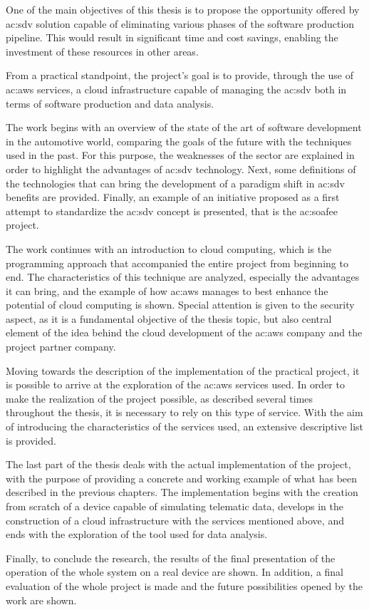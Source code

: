 One of the main objectives of this thesis is to propose the opportunity offered by \gls{ac:sdv} solution capable of eliminating various phases of the software production pipeline. This would result in significant time and cost savings, enabling the investment of these resources in other areas.

From a practical standpoint, the project's goal is to provide, through the use of \gls{ac:aws} services, a cloud infrastructure capable of managing the \gls{ac:sdv} both in terms of software production and data analysis.

The work begins with an overview of the state of the art of software development in the automotive world, comparing the goals of the future with the techniques used in the past. For this purpose, the weaknesses of the sector are explained in order to highlight the advantages of \gls{ac:sdv} technology. Next, some definitions of the technologies that can bring the development of a paradigm shift in \gls{ac:sdv} benefits are provided. Finally, an example of an initiative proposed as a first attempt to standardize the \gls{ac:sdv} concept is presented, that is the \gls{ac:soafee} project.

The work continues with an introduction to cloud computing, which is the programming approach that accompanied the entire project from beginning to end. The characteristics of this technique are analyzed, especially the advantages it can bring, and the example of how \gls{ac:aws} manages to best enhance the potential of cloud computing is shown. Special attention is given to the security aspect, as it is a fundamental objective of the thesis topic, but also central element of the idea behind the cloud development of the \gls{ac:aws} company and the project partner company.

Moving towards the description of the implementation of the practical project, it is possible to arrive at the exploration of the \gls{ac:aws} services used. In order to make the realization of the project possible, as described several times throughout the thesis, it is necessary to rely on this type of service. With the aim of introducing the characteristics of the services used, an extensive descriptive list is provided.

The last part of the thesis deals with the actual implementation of the project, with the purpose of providing a concrete and working example of what has been described in the previous chapters. The implementation begins with the creation from scratch of a device capable of simulating telematic data, develops in the construction of a cloud infrastructure with the services mentioned above, and ends with the exploration of the tool used for data analysis.

Finally, to conclude the research, the results of the final presentation of the operation of the whole system on a real device are shown. In addition, a final evaluation of the whole project is made and the future possibilities opened by the work are shown.